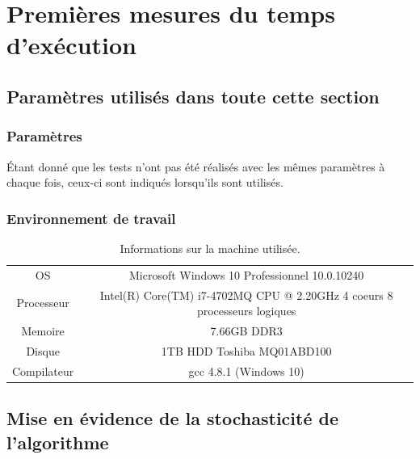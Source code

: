 
\section{Premières mesures du temps d'exécution}

\subsection{Paramètres utilisés dans toute cette section}


\subsubsection{Paramètres}

Étant donné que les tests n'ont pas été réalisés avec les mêmes paramètres à chaque fois, ceux-ci sont indiqués lorsqu'ils sont utilisés.


\subsubsection{Environnement de travail}
\begin{table}[h!]
	\centering
	\caption{Informations sur la machine utilisée.}
	\label{tab:environnementTravail}
	\begin{tabular}{c|c}
		\toprule
		OS & Microsoft Windows 10 Professionnel 10.0.10240\\
		Processeur & Intel(R) Core(TM) i7-4702MQ CPU @ 2.20GHz 4 coeurs 8 processeurs logiques\\
		Memoire & 7.66GB DDR3\\
		Disque & 1TB HDD Toshiba MQ01ABD100\\
		Compilateur & gcc 4.8.1 (Windows 10)\\
		\bottomrule
	\end{tabular}
\end{table}


\subsection{Mise en évidence de la stochasticité de l'algorithme}

